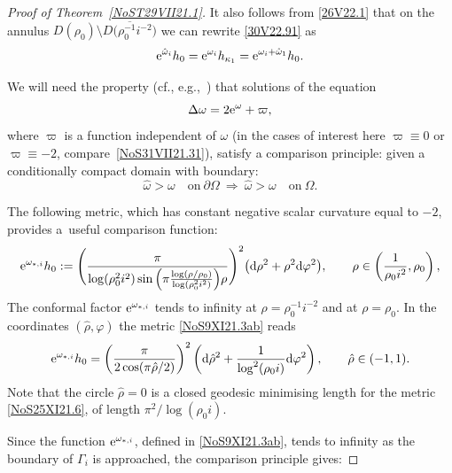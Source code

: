 \documentclass[pdftex]{sigma}
\numberwithin{equation}{section}
\newcommand{\hato}{\red{\omega}}
\newcommand{\hmv}{\red{\hat \omega}}
\newcommand{\rhozero}{\red{\rho_0}}
\newcommand{\blue}[1]{{\color{blue}#1}}
\newcommand{\red}[1]{{\color{red}#1}}
\newcommand{\hrho}{\hat\rho}
\newcommand{\mv}{\omega}%
\renewcommand{\red}[1]{#1}
\renewcommand{\blue}[1]{#1}
\begin{document}
\begin{proof}[Proof of Theorem~\ref{NoST29VII21.1}]
It also follows from \eqref{26V22.1} that on the annulus $D(\rhozero )
 \setminus \overline{D\big(\blue{\rhozero^{-1} i^{-2}}\big)}$
we can rewrite \eqref{30V22.91} as
 \begin{equation*}%
 {\rm e}^{\hmv_i} h_0
 = {\rm e}^{\hato_i} h_{\kappa_1}
 = {\rm e}^{\hato_i + \mathring \omega_1} h_{0}.
 \end{equation*}

We will need the property (cf., e.g.,~\cite{MazzeoTaylor}) that solutions of the equation
\begin{equation*}%
 \Delta \mv= 2 {\rm e}^{\mv} +\varpi,
\end{equation*}
where $\varpi$ is a function independent of $\mv$ (in the cases of interest here $\varpi\equiv 0$ or $\varpi\equiv-2$, compare~\eqref{NoS31VII21.31}),
satisfy a comparison principle: given a conditionally compact domain with boundary:
\begin{equation*}%
 \hat \mv > \mv \quad \text{on} \ \partial\Omega
 \
 \Longrightarrow
 \
 \hat \mv > \mv \quad \text{on} \ \Omega.
\end{equation*}

The following metric, which has constant negative scalar curvature equal to $-2$, provides a~useful comparison function:
\begin{equation}
 \label{NoS9XI21.3ab}
 {\rm e}^{\mv_{*,i}} h_0 :=
\Bigg(
 \frac{\pi }{
 \log (\rho_0^2i^2) \sin\Big( \pi \frac{\log (\rho/\rho_0) }{\log (\rho_0^2i^2)}\Big) \rho}
\Bigg)^2 \big({\rm d}\rho^2+\rho^2 {\rm d}\varphi^2\big), \qquad
 \rho\in \left(\frac1{\rho_0i^2},\rho_0 \right),
\end{equation}
The conformal factor ${\rm e}^{\mv_{*,i}}$ tends to infinity at $\rho=\rhozero^{-1} i^{-2}$ and at $\rho=\rhozero $.
In the coordinates $(\hat \rho, \varphi)$ the metric \eqref{NoS9XI21.3ab} reads
\begin{equation}
 \label{NoS25XI21.6}
 {\rm e}^{\mv_{*,i}}h_0 =
\left(
 \frac{\pi }{
 2 \cos( \pi \hrho/2 )
}
 \right)^2 \left({\rm d}\hrho^2+ \frac{1}{\red{\log^2(\rho_0i)}} {\rm d}\varphi^2\right)
, \qquad
 \hrho\in (-1,1).
\end{equation}
Note that the circle $\hrho =0$ is a closed geodesic minimising length for the metric \eqref{NoS25XI21.6}, of length $\pi^2/\red{\log (\rho_0i)}$.

Since the function ${\rm e}^{\mv_{*,i}}$, defined in \eqref{NoS9XI21.3ab}, tends to infinity as the boundary of $\Gamma_i$ is approached, the comparison principle gives:


\end{proof}
\end{document}
